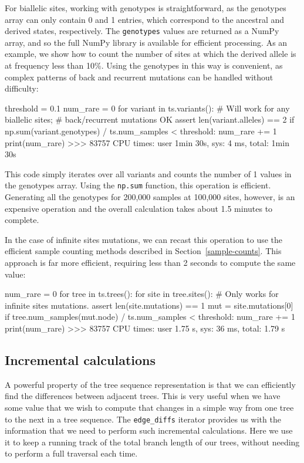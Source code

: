 \documentclass[graybox]{svmult}
\begin{document}
For biallelic sites, working with genotypes is straightforward, as the
genotypes array can only contain 0 and 1 entries, which correspond to
the ancestral and derived states, respectively. The \texttt{genotypes}
values are returned as a NumPy array, and so the full NumPy library is
available for efficient processing. As an example, we show how to
count the number of sites at which the derived allele is at frequency
less than 10\%. Using the genotypes in this way is convenient, as
complex patterns of back and recurrent mutations can be handled without
difficulty:

\begin{pythoncode}
threshold = 0.1
num_rare = 0
for variant in ts.variants():
    # Will work for any biallelic sites;
    # back/recurrent mutations OK
    assert len(variant.alleles) == 2
    if np.sum(variant.genotypes) / ts.num_samples < threshold:
        num_rare += 1
print(num_rare)
>>> 83757
CPU times: user 1min 30s, sys: 4 ms, total: 1min 30s
\end{pythoncode}

This code simply iterates over all variants and
counts the number of 1 values in the genotypes array. Using the \texttt{np.sum}
function, this operation is efficient. Generating all the genotypes for
200,000 samples at 100,000 sites, however,
is an expensive operation and the overall calculation takes about 1.5 minutes
to complete.

In the case of infinite sites mutations, we can recast this operation
to use the efficient sample counting methods described in
Section~\ref{sample-counts}. This approach is far more
efficient, requiring less than 2 seconds to compute the same value:
\begin{pythoncode}
num_rare = 0
for tree in ts.trees():
  for site in tree.sites():
    # Only works for infinite sites mutations.
    assert len(site.mutations) == 1
    mut = site.mutations[0]
    if tree.num_samples(mut.node) / ts.num_samples < threshold:
        num_rare += 1
print(num_rare)
>>> 83757
CPU times: user 1.75 s, sys: 36 ms, total: 1.79 s
\end{pythoncode}

\subsection{Incremental calculations}\label{incremental-calculations}

A powerful property of the tree sequence representation is that we can
efficiently find the differences between adjacent trees. This is very
useful when we have some value that we wish to compute that changes in a
simple way from one tree to the next in a tree sequence. 
The \texttt{edge\_diffs} iterator provides us
with the information that we need to perform such incremental
calculations. Here we use it to keep a running track of the total branch
length of our trees, without needing to perform a full traversal each
time.
\end{document}
